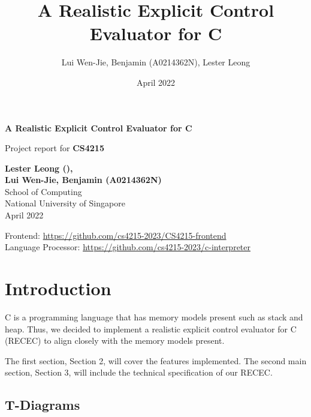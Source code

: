 \documentclass[a4paper]{article}
\title{A Realistic Explicit Control Evaluator for C}
\author{Lui Wen-Jie, Benjamin (A0214362N), Lester Leong }
\date{April 2022}
\begin{document}

\begin{titlepage}
    \begin{center}
        \vspace*{1cm}

        \LARGE
        \textbf{A Realistic Explicit Control Evaluator for C}

        \vspace{0.5cm}        
		Project report for \textbf{CS4215}

        \vspace{3cm}

        \Large
        \textbf{Lester Leong (), \\Lui Wen-Jie, Benjamin (A0214362N)}\\
        School of Computing\\
        National University of Singapore\\
        April 2022

		\vspace{3cm}
		\small
		Frontend: \url{https://github.com/cs4215-2023/CS4215-frontend} \\
		Language Processor: \url{https://github.com/cs4215-2023/c-interpreter}

		\vfill

    \end{center}
\end{titlepage}

\tableofcontents
\newpage

\section{Introduction}

C is a programming language that has memory models present such as stack and heap. Thus, we decided to implement a realistic explicit control evaluator for C (RECEC) to align closely with the memory models present. 

The first section, Section 2, will cover the features implemented. The second main section, Section 3, will include the technical specification of our RECEC.

\subsection{T-Diagrams}
\end{document}
